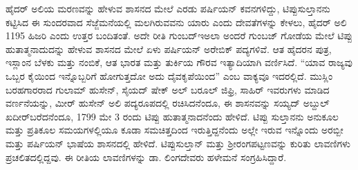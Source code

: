 ಹೈದರ್​ ಅಲಿಯ ಮರಣವನ್ನು ಹೇಳುವ ಶಾಸನದ ಮೇಲೆ ಎರಡು ಪರ್ಷಿಯನ್​ ಕವನಗಳಿದ್ದು, ಟಿಪ್ಪುಸುಲ್ತಾನನು ಕಟ್ಟಿಸಿದ ಈ ಸುಂದರವಾದ ಸೆಜ್ಜೆಮನೆಯಲ್ಲಿ ಮಲಗಿರುವವನು ಯಾರು ಎಂದು ದೇವತೆಗಳನ್ನು ಕೇಳಲು, ಹೈದರ್​ ಅಲಿ 1195 ಹಿಜರಿ ಎಂದು ಉತ್ತರ ಬಂದಿತಂತೆ. ಅದೇ ರೀತಿ ಗುಂಬದ್​\enginline{-}ಇ​\enginline{-}ಅಲಾ ಅಂದರೆ ಗುಂಬಜ್​ ಗೋಡೆಯ ಮೇಲೆ ಟಿಪ್ಪು ಹುತಾತ್ಮನಾದುದನ್ನು ಹೇಳುವ ಶಾಸನದ ಮೇಲೆ ಏಳು ಪರ್ಷಿಯನ್​ ಅರೇಬಿಕ್​ ಪದ್ಯಗಳಿವೆ. ಆತ ಹೈದರನ ಪುತ್ರ, ಇಸ್ಲಾಂನ ಬೆಳಕು ಮತ್ತು ನಂಬಿಕೆ, ಆತ ಭಾರತ ಮತ್ತು ತುರ್ಕಿಯ ಗೌರವ ಇತ್ಯಾದಿಯಾಗಿ ವರ್ಣಿಸಿದೆ. “ಯಾವ ರಾಜ್ಯವು ಒಬ್ಬರ ಕೈಯಿಂದ ಇನ್ನೊಬ್ಬರಿಗೆ ಹೋಗುತ್ತದೋ ಅದು ದೈವಕೃಪೆಯಿಂದ” ಎಂಬ ವಾಕ್ಯವೂ ಇದರಲ್ಲಿದೆ. ಮುಸ್ಲಿಂ ಬರಹಗಾರರಾದ ಗುಲಾಮ್ ಹುಸೇನ್​, ಸೈಯದ್​ ಷೇಕ್​ ಅಲ್​ ಬರೂಲ್​ ಜಿಫ್ರಿ, ಸಾಹಿರ್​ ಇವರುಗಳು ಮಾಡಿದ ವರ್ಣನೆಯನ್ನು, ಮೀರ್​ ಹುಸೇನ್​ ಅಲಿ ಪದ್ಯರೂಪದಲ್ಲಿ ರಚಿಸಿದನೆಂದೂ, ಈ ಶಾಸನವನ್ನು ಸಯ್ಯದ್​ ಅಬ್ದುಲ್​ ಖದೀರ್​ ಬರೆದನೆಂದೂ, 1799 ಮೇ 3 ರಂದು ಟಿಪ್ಪು ಹುತಾತ್ಮನಾದನೆಂದು ಹೇಳಿದೆ. ಟಿಪ್ಪು ಸುಲ್ತಾನನು ಅನುಕೂಲ ಮತ್ತು ಪ್ರತಿಕೂಲ ಸಮಯಗಳಲ್ಲಿಯೂ ಕೂಡಾ ಸಮಚಿತ್ತದಿಂದ ಇರುತ್ತಿದ್ದನೆಂದು ಅಲ್ಲೇ ಇರುವ ಇನ್ನೊಂದು ಅರಬ್ಬೀ ಮತ್ತು ಪರ್ಷಿಯನ್​ ಭಾಷೆಯ ಶಾಸನದಲ್ಲಿ ಹೇಳಿದೆ. ಟಿಪ್ಪುಸುಲ್ತಾನ್​ ಮತ್ತು ಶ‍್ರೀರಂಗಪಟ್ಟಣವನ್ನು ಕುರಿತು ಲಾವಣಿಗಳು ಪ್ರಚಲಿತದಲ್ಲಿದ್ದವು. ಈ ರೀತಿಯ ಲಾವಣಿಗಳನ್ನು ಡಾ. ಲಿಂಗದೇವರು ಹಳೇಮನೆ ಸಂಗ್ರಹಿಸಿದ್ದಾರೆ.

\theendnotes

